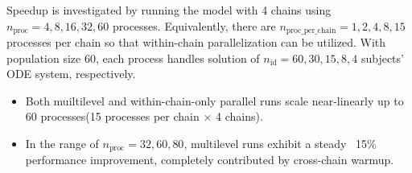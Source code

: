 \documentclass[landscape,a0paper,fontscale=0.45]{baposter} %
\begin{document}
\begin{poster}
{\begin{multicols}{2}
Speedup is investigated by running the model
with 4 chains using \(n_{\text{proc}} = 4, 8, 16, 32, 60\)
processes. Equivalently, there are
\(n_{\text{proc\_per\_chain}} = 1, 2, 4, 8, 15\)
processes per chain so that within-chain parallelization can be utilized.
With population size 60, each process handles solution of
\(n_{\text{id}} = 60, 30, 15, 8, 4\)
subjects' ODE system, respectively.
\begin{itemize}
\item Both muiltilevel and within-chain-only parallel runs scale near-linearly up to 60
  processes(15 processes per chain \(\times\) 4 chains).
\item In the range of \(n_{\text{proc}}=32, 60, 80\), multilevel runs
  exhibit a steady ~15\% performance improvement, completely
  contributed by cross-chain warmup.
\end{itemize}

\end{multicols}
\vspace{0.5em}
}






\end{poster}
\end{document}
